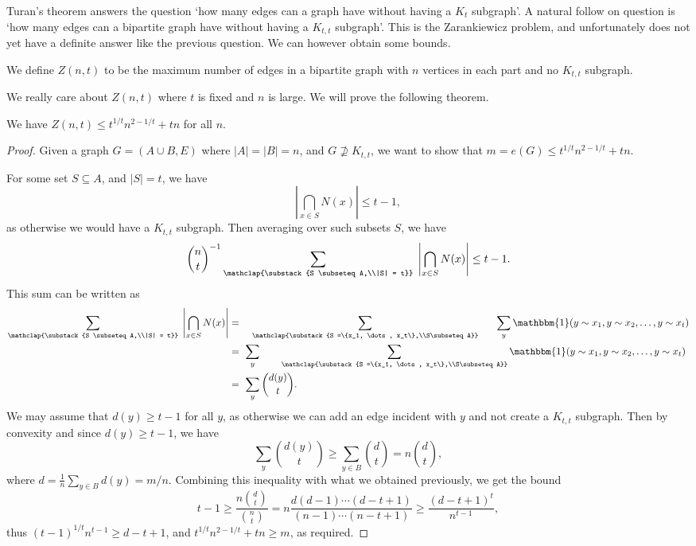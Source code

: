 Turan's theorem answers the question `how many edges can a graph have without having a $K_{t}$ subgraph'. A natural follow on question is `how many edges can a bipartite graph have without having a $K_{t, t}$ subgraph'. This is the Zarankiewicz problem, and unfortunately does not yet have a definite answer like the previous question. We can however obtain some bounds.

\begin{definition}
    We define $Z(n, t)$ to be the maximum number of edges in a bipartite graph with $n$ vertices in each part and no $K_{t, t}$ subgraph.
\end{definition}

We really care about $Z(n, t)$ where $t$ is fixed and $n$ is large. We will prove the following theorem.

\begin{theorem}
   We have $Z(n, t) \leq t^{1/t} n^{2 - 1/t} + tn$ for all $n$.
\end{theorem}
\begin{proof}
    Given a graph $G = (A \cup B, E)$ where $|A| = |B| = n$, and $G \not \supseteq K_{t, t}$, we want to show that $m = e(G) \leq t^{1/t} n^{2 - 1/t} + tn$.

    For some set $S \subseteq A$, and $|S| = t$, we have
    $$
    \left|\bigcap_{x \in S} N(x)\right| \leq t - 1,
    $$
    as otherwise we would have a $K_{t, t}$ subgraph. Then averaging over such subsets $S$, we have
    $$
    \binom{n}{t}^{-1} \sum_{\mathclap{\substack{S \subseteq A,\\|S| = t}}}\;  \left|\bigcap_{x \in S} N(x)\right| \leq t - 1.
    $$
    This sum can be written as
    \begin{align*}
        \sum_{\mathclap{\substack{S \subseteq A,\\|S| = t}}}\;  \left|\bigcap_{x \in S} N(x)\right| &=\ \  \ \sum_{\mathclap{\substack{S =\{x_1, \dots, x_t\},\\S\subseteq A}}}\  \ \ \ \  \sum_{y} \mathbbm{1}(y \sim x_1, y \sim x_2, \dots, y\sim x_t) \\
        &= \ \sum_{y}\ \ \ \ \  \ \sum_{\mathclap{\substack{S =\{x_1, \dots, x_t\},\\S\subseteq A}}} \mathbbm{1}(y \sim x_1, y \sim x_2, \dots, y\sim x_t) \\
        &=\  \sum_y \binom{d(y)}{t}.
    \end{align*}
    We may assume that $d(y) \geq t - 1$ for all $y$, as otherwise we can add an edge incident with $y$ and not create a $K_{t, t}$ subgraph. Then by convexity and since $d(y) \geq t - 1$, we have
    $$
    \sum_y \binom{d(y)}{t} \geq \sum_{y \in B} \binom{d}{t} = n \binom{d}{t},
    $$
    where $d = \frac{1}{n} \sum_{y \in B} d(y) = m/n$. Combining this inequality with what we obtained previously, we get the bound
    $$
    t - 1 \geq \frac{n \binom{d}{t}}{\binom{n}{t}}  = n \frac{d(d - 1) \cdots (d - t + 1)}{(n - 1) \cdots (n - t + 1)} \geq \frac{(d - t + 1)^t}{n^{t - 1}},
    $$
    thus $(t - 1)^{1/t} n^{t - 1} \geq d - t + 1$, and $t^{1/t} n^{2 - 1/t} + tn \geq m$, as required.
\end{proof}

